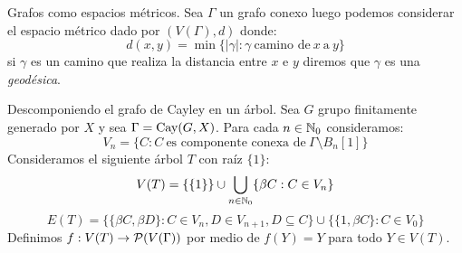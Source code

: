 \documentclass[aspectratio=169, 10pt]{beamer}
\begin{document}
	\begin{frame}[fragile]{Grafos como espacios métricos.}
		Sea $\Gamma$ un grafo conexo luego podemos considerar el espacio métrico dado por $(V(\Gamma), d)$ donde:
		\[
			d(x,y) = \min \{ |\gamma| : \gamma \ \text{camino de} \ x  \ \text{a} \ y  \}	
		\]
		\pause 
		si $\gamma$ es un camino que realiza la distancia entre $x$ e $y$ diremos que $\gamma$ es una \emph{geodésica}.
		\pause 
	\end{frame}

	\begin{frame}[fragile]{Descomponiendo el grafo de Cayley en un árbol.}
		Sea $G$ grupo finitamente generado por $X$ y sea $\Gamma = \text{Cay}(G, X)$.
		\pause 
		Para cada $n \in \mathbb{N}_{0}$ consideramos:
		\[
			V_{n} = \{C : C \ \text{es componente conexa de} \ \Gamma \setminus B_{n}[1]\}	
		\]
		\pause 
		Consideramos el siguiente árbol $T$ con raíz $\{1\}$:
		\pause 
		\[
			V(T) = \{ \{1\}\} \cup \bigcup_{n \in \mathbb{N}_{0}}  \{ \beta C : C \in V_{n} \}
		\]
		\pause 
		\[
			E(T) = \{ \{\beta C, \beta D\} : C \in V_{n}, D \in V_{n+1}, D \subseteq C\} \cup 
			\{ \{1, \beta C\} : C \in V_{0} \}
		\]
		\pause 
		Definimos $f: V(T) \to {\cal{P}}(V(\Gamma))$ por medio de $f(Y) = Y$ para todo $Y \in V(T)$.
		\pause 
		
		
	\end{frame}
\end{document}
